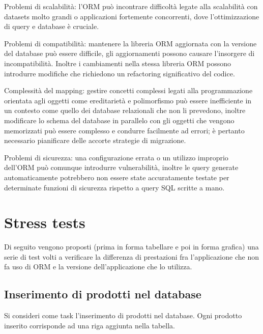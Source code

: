 Problemi di scalabilità: l'ORM può incontrare difficoltà legate alla scalabilità con datasets molto grandi o applicazioni fortemente concorrenti, dove l'ottimizzazione di query e database è cruciale.

Problemi di compatibilità: mantenere la libreria ORM aggiornata con la versione del database può essere difficile, gli aggiornamenti possono causare l'insorgere di incompatibilità. Inoltre i cambiamenti nella stessa libreria ORM possono introdurre modifiche che richiedono un refactoring significativo del codice.

Complessità del mapping: gestire concetti complessi legati alla programmazione orientata agli oggetti come ereditarietà e polimorfismo può essere inefficiente in un contesto come quello dei database relazionali che non li prevedono, inoltre modificare lo schema del database in parallelo con gli oggetti che vengono memorizzati può essere complesso e condurre facilmente ad errori; è pertanto necessario pianificare delle accorte strategie di migrazione.

Problemi di sicurezza: una configurazione errata o un utilizzo improprio dell'ORM può comunque introdurre vulnerabilità, inoltre le query generate automaticamente potrebbero non essere state accuratamente testate per determinate funzioni di sicurezza rispetto a query SQL scritte a mano.

\newpage

\section{Stress tests}

Di seguito vengono proposti (prima in forma tabellare e poi in forma grafica) una serie di test volti a verificare la differenza di prestazioni fra l'applicazione che non fa uso di ORM e la versione dell'applicazione che lo utilizza.

\subsection{Inserimento di prodotti nel database}

Si consideri come task l'inserimento di prodotti nel database. Ogni prodotto inserito corrisponde ad una riga aggiunta nella tabella.

